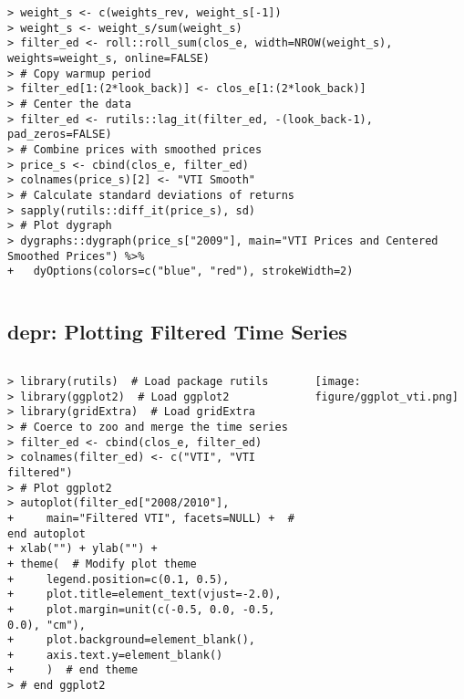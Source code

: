 \documentclass[10pt]{beamer}\usepackage[]{graphicx}\usepackage[]{color}
\makeatletter
\newenvironment{kframe}{%
 \def\at@end@of@kframe{}%
 \ifinner\ifhmode%
  \def\at@end@of@kframe{\end{minipage}}%
  \begin{minipage}{\columnwidth}%
 \fi\fi%
 \def\FrameCommand##1{\hskip\@totalleftmargin \hskip-\fboxsep
 \colorbox{shadecolor}{##1}\hskip-\fboxsep
     \hskip-\linewidth \hskip-\@totalleftmargin \hskip\columnwidth}%
 \MakeFramed {\advance\hsize-\width
   \@totalleftmargin\z@ \linewidth\hsize
   \@setminipage}}%
 {\par\unskip\endMakeFramed%
 \at@end@of@kframe}
\newenvironment{knitrout}{}{} %
\makeatother
\begin{document}
\begin{frame}[fragile,t]{\subsecname}
\begin{block}{}
\begin{columns}[T]
\begin{knitrout}
\begin{kframe}
\begin{verbatim}
> weight_s <- c(weights_rev, weight_s[-1])
> weight_s <- weight_s/sum(weight_s)
> filter_ed <- roll::roll_sum(clos_e, width=NROW(weight_s), weights=weight_s, online=FALSE)
> # Copy warmup period
> filter_ed[1:(2*look_back)] <- clos_e[1:(2*look_back)]
> # Center the data
> filter_ed <- rutils::lag_it(filter_ed, -(look_back-1), pad_zeros=FALSE)
> # Combine prices with smoothed prices
> price_s <- cbind(clos_e, filter_ed)
> colnames(price_s)[2] <- "VTI Smooth"
> # Calculate standard deviations of returns
> sapply(rutils::diff_it(price_s), sd)
> # Plot dygraph
> dygraphs::dygraph(price_s["2009"], main="VTI Prices and Centered Smoothed Prices") %>%
+   dyOptions(colors=c("blue", "red"), strokeWidth=2)
\end{verbatim}
\end{kframe}
\end{knitrout}
  \end{columns}
\end{block}

\end{frame}


\subsection{depr: Plotting Filtered Time Series}
\begin{frame}[fragile,t]{\subsecname}
\vspace{-1em}
\begin{block}{}
  \begin{columns}[T]
      \vspace{-1em}
\begin{knitrout}\tiny
{}\color{fgcolor}\begin{kframe}
\begin{verbatim}
> library(rutils)  # Load package rutils
> library(ggplot2)  # Load ggplot2
> library(gridExtra)  # Load gridExtra
> # Coerce to zoo and merge the time series
> filter_ed <- cbind(clos_e, filter_ed)
> colnames(filter_ed) <- c("VTI", "VTI filtered")
> # Plot ggplot2
> autoplot(filter_ed["2008/2010"],
+     main="Filtered VTI", facets=NULL) +  # end autoplot
+ xlab("") + ylab("") +
+ theme(  # Modify plot theme
+     legend.position=c(0.1, 0.5),
+     plot.title=element_text(vjust=-2.0),
+     plot.margin=unit(c(-0.5, 0.0, -0.5, 0.0), "cm"),
+     plot.background=element_blank(),
+     axis.text.y=element_blank()
+     )  # end theme
> # end ggplot2
\end{verbatim}
\end{kframe}
\end{knitrout}
      \hspace*{-1em}
      \texttt{[image: figure/ggplot\_vti.png]}
  \end{columns}
\end{block}

\end{frame}
\end{document}
